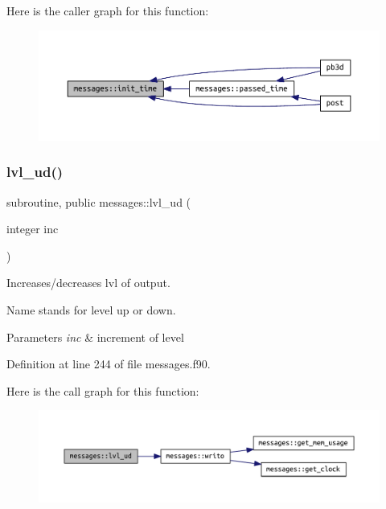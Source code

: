 Here is the caller graph for this function\+:
\nopagebreak
\begin{figure}[H]
\begin{center}
\leavevmode
\includegraphics[width=350pt]{namespacemessages_a8ed785522aec7ac549263cdd54a8619a_icgraph}
\end{center}
\end{figure}
\mbox{\label{namespacemessages_a6e6bfb084063e4cc91ee86e542043302}} 
\subsubsection{\texorpdfstring{lvl\+\_\+ud()}{lvl\_ud()}}
{\footnotesize\ttfamily subroutine, public messages\+::lvl\+\_\+ud (\begin{DoxyParamCaption}\item[{integer}]{inc }\end{DoxyParamCaption})}



Increases/decreases {\ttfamily lvl} of output. 

Name stands for level up or down.


\begin{DoxyParams}{Parameters}
{\em inc} & increment of level \\
\hline
\end{DoxyParams}


Definition at line 244 of file messages.\+f90.

Here is the call graph for this function\+:
\nopagebreak
\begin{figure}[H]
\begin{center}
\leavevmode
\includegraphics[width=350pt]{namespacemessages_a6e6bfb084063e4cc91ee86e542043302_cgraph}
\end{center}
\end{figure}
\mbox{\label{namespacemessages_a34da9df28502ccd63e62674d51fe8de8}} 
